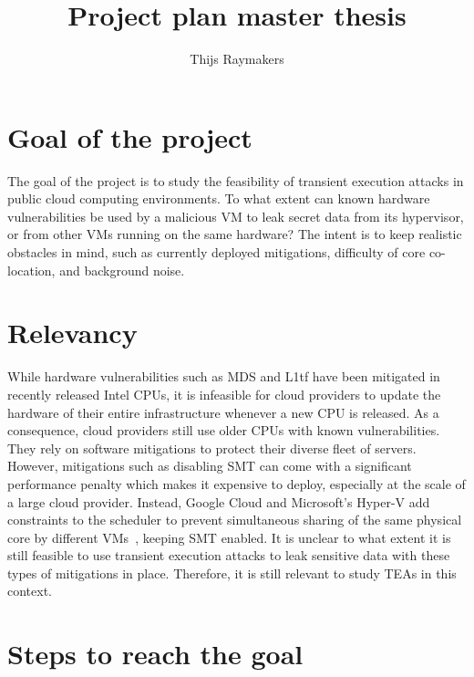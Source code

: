 \documentclass[draft, a4paper, 11pt]{article}
\title{Project plan master thesis}
\author{Thijs Raymakers}
\begin{document}
\maketitle

\section{Goal of the project}
The goal of the project is to study the feasibility of transient execution attacks in public cloud computing environments.
To what extent can known hardware vulnerabilities be used by a malicious VM to leak secret data from its hypervisor, or from other VMs running on the same hardware?
The intent is to keep realistic obstacles in mind, such as currently deployed mitigations, difficulty of core co-location, and background noise.

\section{Relevancy}
While hardware vulnerabilities such as MDS and L1tf have been mitigated in recently released Intel CPUs, it is infeasible for cloud providers to update the hardware of their entire infrastructure whenever a new CPU is released.
As a consequence, cloud providers still use older CPUs with known vulnerabilities.
They rely on software mitigations to protect their diverse fleet of servers.
However, mitigations such as disabling SMT can come with a significant performance penalty which makes it expensive to deploy, especially at the scale of a large cloud provider.
Instead, Google Cloud and Microsoft's Hyper-V add constraints to the scheduler to prevent simultaneous sharing of the same physical core by different VMs~\cite{cooleyHyperVHyperClearMitigation2023, turnerProtectingNewL1TF2018}, keeping SMT enabled.
It is unclear to what extent it is still feasible to use transient execution attacks to leak sensitive data with these types of mitigations in place.
Therefore, it is still relevant to study TEAs in this context.

\section{Steps to reach the goal}
\end{document}
